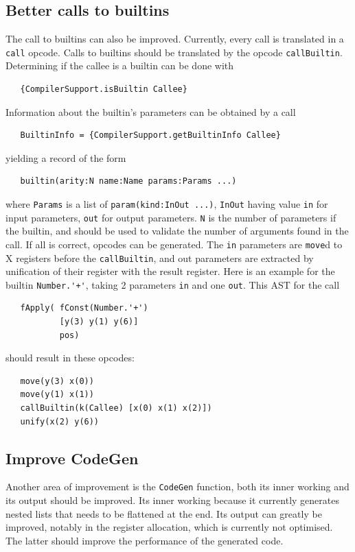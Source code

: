 \documentclass[a4paper]{memoir}
\begin{document}
\subsection{Better calls to builtins}
The call to builtins can also be improved. Currently, every call is translated in a \lstinline!call! opcode. Calls to builtins should
be translated by the opcode \lstinline!callBuiltin!. Determining if the callee is a builtin can be done with 
\begin{lstlisting}
   {CompilerSupport.isBuiltin Callee}
\end{lstlisting}

Information about the builtin's parameters can be obtained by a call
\begin{lstlisting}
   BuiltinInfo = {CompilerSupport.getBuiltinInfo Callee}
\end{lstlisting}
yielding a record of the form
\begin{lstlisting}
   builtin(arity:N name:Name params:Params ...)
\end{lstlisting}
where \lstinline!Params! is a list of \lstinline!param(kind:InOut ...)!,
\lstinline!InOut! having value \lstinline!in! for input parameters,
\lstinline!out! for output parameters.
\lstinline!N! is the number of parameters if the builtin, and should be used to 
validate the number of arguments found in the call. If all is correct, opcodes can be generated.
The \lstinline!in! parameters are \lstinline!move!d to X registers before the \lstinline!callBuiltin!, and out parameters are
extracted by unification of their register with the result register. 
Here is an example for the builtin \lstinline!Number.'+'!, taking 2 parameters
\lstinline!in! and one \lstinline!out!. This AST for the call
\begin{lstlisting}
   fApply( fConst(Number.'+') 
           [y(3) y(1) y(6)] 
           pos)
\end{lstlisting}
should result in these opcodes:
\begin{lstlisting}
   move(y(3) x(0))
   move(y(1) x(1))
   callBuiltin(k(Callee) [x(0) x(1) x(2)])
   unify(x(2) y(6))
\end{lstlisting}

\subsection{Improve CodeGen}
Another area of improvement is the \lstinline!CodeGen! function, both its inner working and its output should be improved.
Its inner working because it currently generates nested lists that needs to be flattened at the end. Its output can greatly be improved, 
notably in the register allocation, which is currently not optimised. The latter should improve the performance of the generated code.
\end{document}
